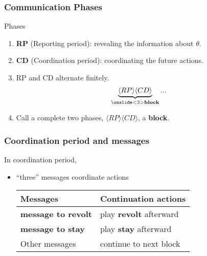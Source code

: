 \documentclass[9pt]{beamer}
\begin{document}
\begin{frame}
  \frametitle{Communication Phases}


Phases 
\begin{enumerate}
\item<1-> \textbf{RP} (Reporting period): revealing the information about $\theta$. 
\item<1-> \textbf{CD} (Coordination period): coordinating the future actions.
\item<2-> RP and CD alternate finitely.
\[\underbrace{\langle RP \rangle \langle CD \rangle}_{\onslide<3>{\textbf{{block}}}}...\]
\item<3> Call a complete two phases, $\langle RP \rangle \langle CD \rangle$, a \textbf{block}. 
\end{enumerate}







\end{frame}








\begin{frame}


\frametitle{Coordination period and messages}


In coordination period, 
\begin{itemize}
\item ``three'' messages coordinate actions

\begin{table}[h]
\begin{tabular}{l l}
Messages & Continuation actions\\
\hline
\textbf{message to {revolt}}& play \textbf{revolt} afterward\\
\textbf{message to {stay}} & play \textbf{stay} afterward\\
Other messages &  continue to next block 
\end{tabular}
\end{table}

\end{itemize}



\end{frame}
\end{document}
